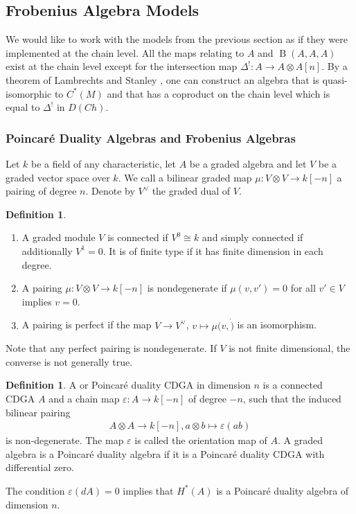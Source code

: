 \documentclass{scrartcl}
\let\emph\relax
\theoremstyle{plain}
\theoremstyle{definition}
\newtheorem{definition}[theorem]{Definition}
\renewcommand{\epsilon}{\varepsilon}
\newcommand{\iso}{\cong}
\DeclareMathOperator{\BC}{B}
\begin{document}
\subsection{Frobenius Algebra Models}\label{subsec:poincare-algebra}

We would like to work with the models from the previous section as if they were implemented at the chain level. All the maps relating to $A$ and $\BC(A, A, A)$ exist at the chain level except for the intersection map $\Delta^!\colon A\to A\otimes A[n]$. 
By a theorem of Lambrechts and Stanley \cite{lambrechts2008poincare}, one can construct an algebra that is quasi-isomorphic to $C^*(M)$ and that has a coproduct on the chain level which is equal to $\Delta^!$ in $D(Ch)$. 

\subsubsection{Poincaré Duality Algebras and Frobenius Algebras}

Let $k$ be a field of any characteristic, let $A$ be a graded algebra and let $V$ be a graded vector space over $k$. We call a bilinear graded map $\mu\colon V\otimes V\to k[-n]$ a pairing of degree $n$. Denote by $V^\vee$ the graded dual of $V$.

\begin{definition}
    \begin{enumerate}
        \item A graded module $V$ is connected if $V^0 \iso k$ and simply connected if additionally $V^1 = 0$. It is of finite type if it has finite dimension in each degree.
        \item A pairing $\mu\colon V\otimes V\to k[-n]$ is nondegenerate if $\mu(v, v') = 0$ for all $v'\in V$ implies $v=0$.
        \item A pairing is perfect if the map $V\to V^\vee$, $v\mapsto \mu(v,\dot)$ is an isomorphism. 
    \end{enumerate}
\end{definition}

Note that any perfect pairing is nondegenerate. If $V$ is not finite dimensional, the converse is not generally true. 

\begin{definition}
    A \emph{Poincaré duality algebra} or Poincaré duality CDGA in dimension $n$ is a connected CDGA $A$ and a chain map $\epsilon\colon A\to k[-n]$ of degree $-n$, such that the induced bilinear pairing
    \begin{align*}
        A\otimes A\to k[-n], a\otimes b\mapsto \epsilon(ab)
    \end{align*}
    is non-degenerate. The map $\epsilon$ is called the orientation map of $A$. A graded algebra is a Poincaré duality algebra if it is a Poincaré duality CDGA with differential zero. 
\end{definition}
The condition $\epsilon(dA) = 0$ implies that $H^*(A)$ is a Poincaré duality algebra of dimension $n$.
\end{document}
